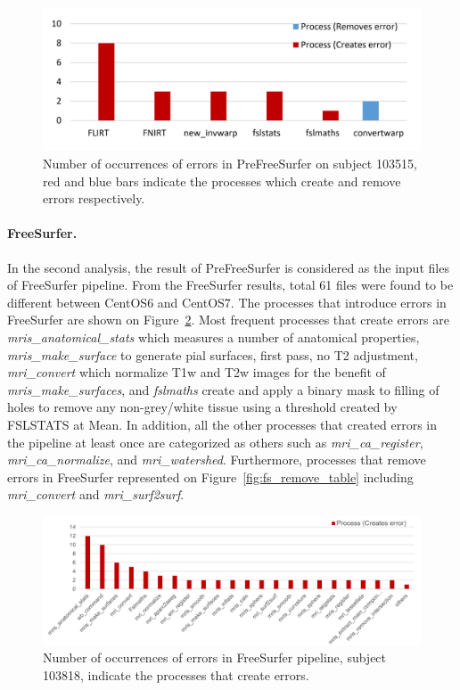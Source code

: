 \documentclass{article}
\begin{document}
{\begin{figure}[H]
\centering
  \includegraphics[scale=0.38]{images/pfs_chart.png} \caption{Number 
  of occurrences of errors in PreFreeSurfer on subject 103515, red and 
  blue bars indicate the processes which create and remove errors 
  respectively.} 
  \label{fig:pfs_chart}
\end{figure}


\paragraph{FreeSurfer.} In the second analysis, the result of 
PreFreeSurfer is considered as the input files of FreeSurfer pipeline. 
From the FreeSurfer results, total 61 files were found to be different 
between CentOS6 and CentOS7. The processes that introduce errors in 
FreeSurfer are shown on Figure~\ref{fig:fs_error_table}. Most frequent 
processes that create errors are \emph{mris\_anatomical\_stats} which 
measures a number of anatomical properties, \emph{mris\_make\_surface} 
to generate pial surfaces, first pass, no T2 adjustment, 
\emph{mri\_convert} which normalize T1w and T2w images for the benefit 
of \emph{mris\_make\_surfaces}, and \emph{fslmaths} create and apply a 
binary mask to filling of holes to remove  any non-grey/white tissue 
using a threshold created by FSLSTATS at Mean. In addition, all the 
other processes that created errors in the pipeline at least once are 
categorized as others such as \emph{mri\_ca\_register}, 
\emph{mri\_ca\_normalize}, and \emph{mri\_watershed}. Furthermore, 
processes that remove errors in FreeSurfer represented on 
Figure~\ref{fig:fs_remove_table} including \emph{mri\_convert} and 
\emph{mri\_surf2surf}. 

\begin{figure}[H] 
\centering
  \includegraphics[scale=0.6]{images/fs_error_table.png} 
  \caption{Number of occurrences of errors in FreeSurfer pipeline, 
subject 103818, indicate the processes that create errors.}
  \label{fig:fs_error_table}
\end{figure}

}
\end{document}
